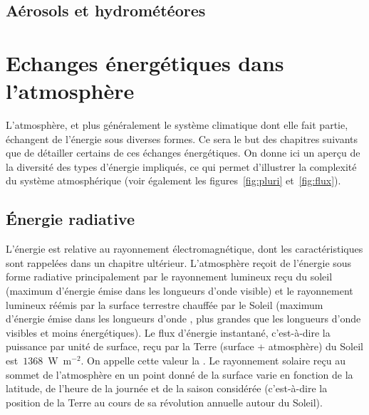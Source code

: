 	\sk \subsection{Aérosols et hydrométéores}
	



\mk 
\section{Echanges énergétiques dans l'atmosphère}

\sk
L'atmosphère, et plus généralement le système climatique dont elle fait partie, échangent de l'énergie sous diverses formes. Ce sera le but des chapitres suivants que de détailler certains de ces échanges énergétiques. On donne ici un aperçu de la diversité des types d'énergie impliqués, ce qui permet d'illustrer la complexité du système atmosphérique (voir également les figures~\ref{fig:pluri} et~\ref{fig:flux}). 


\sk
\subsection{\'Energie radiative}\label{sec:energrad}

\sk
L'énergie  est relative au rayonnement électromagnétique, dont les caractéristiques sont rappelées dans un chapitre ultérieur. L'atmosphère reçoit de l'énergie sous forme radiative principalement par le rayonnement lumineux reçu du soleil (maximum d'énergie émise dans les longueurs d'onde visible) et le rayonnement lumineux réémis par la surface terrestre chauffée par le Soleil (maximum d'énergie émise dans les longueurs d'onde , plus grandes que les longueurs d'onde visibles et moins énergétiques). Le flux d'énergie instantané, c'est-à-dire la puissance par unité de surface, reçu par la Terre (surface + atmosphère) du Soleil est~$1368$~W~m$^{-2}$. On appelle cette valeur la . Le rayonnement solaire reçu au sommet de l'atmosphère en un point donné de la surface varie en fonction de la latitude, de l'heure de la journée et de la saison considérée (c'est-à-dire la position de la Terre au cours de sa révolution annuelle autour du Soleil). %

